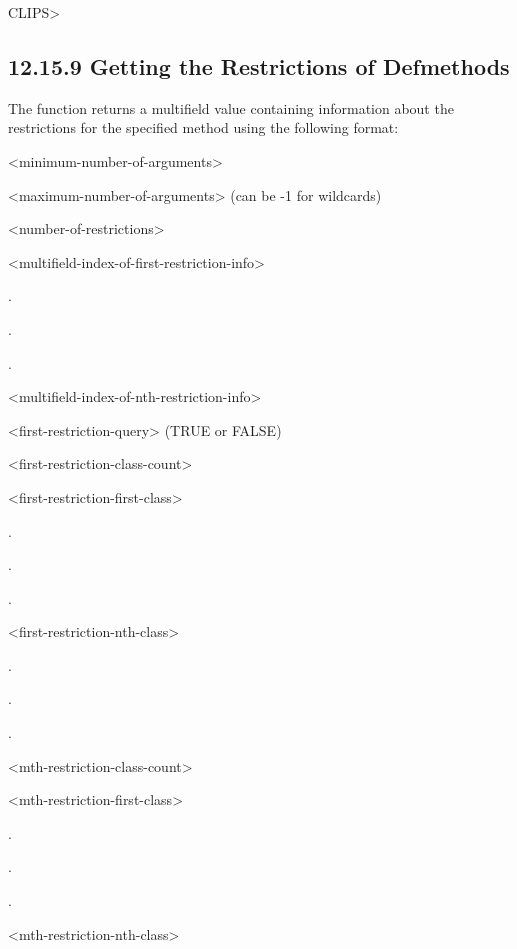 \documentclass[letterpaper,10pt,english]{sphinxmanual}
\begin{document}
CLIPS\textgreater{}


\subsection{12.15.9 Getting the Restrictions of Defmethods}
\label{\detokenize{actions:getting-the-restrictions-of-defmethods}}
The function  returns a multifield value
containing information about the restrictions for the specified method
using the following format:

\textless{}minimum-number-of-arguments\textgreater{}

\textless{}maximum-number-of-arguments\textgreater{} (can be -1 for wildcards)

\textless{}number-of-restrictions\textgreater{}

\textless{}multifield-index-of-first-restriction-info\textgreater{}

.

.

.

\textless{}multifield-index-of-nth-restriction-info\textgreater{}

\textless{}first-restriction-query\textgreater{} (TRUE or FALSE)

\textless{}first-restriction-class-count\textgreater{}

\textless{}first-restriction-first-class\textgreater{}

.

.

.

\textless{}first-restriction-nth-class\textgreater{}

.

.

.

\textless{}mth-restriction-class-count\textgreater{}

\textless{}mth-restriction-first-class\textgreater{}

.

.

.

\textless{}mth-restriction-nth-class\textgreater{}


\begin{sphinxVerbatim}[commandchars=\\\{\}]
 
\end{sphinxVerbatim}
\end{document}
